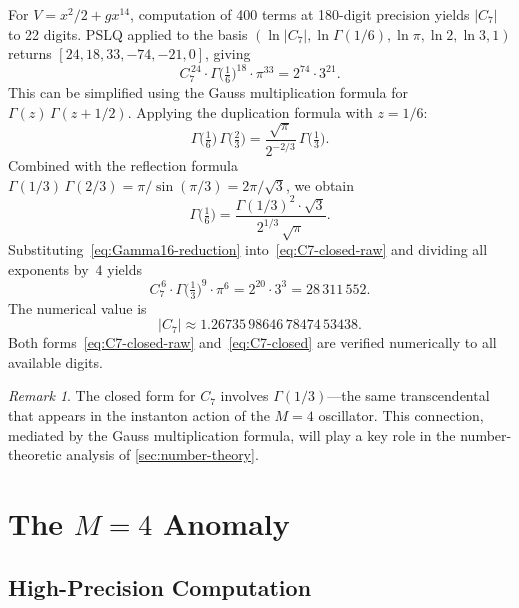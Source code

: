 \documentclass[12pt,a4paper]{article}
\numberwithin{equation}{section}
\theoremstyle{plain}
\theoremstyle{definition}
\theoremstyle{remark}
\newtheorem{remark}[theorem]{Remark}
\begin{document}
For $V = x^2/2 + gx^{14}$, computation of 400 terms at 180-digit precision
yields $|C_7|$ to 22 digits. PSLQ applied to the basis
$(\ln|C_7|, \ln\Gamma(1/6), \ln\pi, \ln 2, \ln 3, 1)$
returns $[24, 18, 33, -74, -21, 0]$, giving
\begin{equation}\label{eq:C7-closed-raw}
  C_7^{\,24} \cdot \Gamma\!\bigl(\tfrac{1}{6}\bigr)^{18} \cdot \pi^{33}
  = 2^{74} \cdot 3^{21}.
\end{equation}
This can be simplified using the Gauss multiplication formula for
$\Gamma(z)\,\Gamma(z + 1/2)$. Applying the duplication formula with
$z = 1/6$:
\[
  \Gamma\!\bigl(\tfrac{1}{6}\bigr)\,\Gamma\!\bigl(\tfrac{2}{3}\bigr)
  = \frac{\sqrt{\pi}}{2^{-2/3}}\,\Gamma\!\bigl(\tfrac{1}{3}\bigr).
\]
Combined with the reflection formula
$\Gamma(1/3)\,\Gamma(2/3) = \pi/\sin(\pi/3) = 2\pi/\sqrt{3}$,
we obtain
\begin{equation}\label{eq:Gamma16-reduction}
  \Gamma\!\bigl(\tfrac{1}{6}\bigr) =
  \frac{\Gamma(1/3)^2 \cdot \sqrt{3}}{2^{1/3}\,\sqrt{\pi}}.
\end{equation}
Substituting~\eqref{eq:Gamma16-reduction}
into~\eqref{eq:C7-closed-raw} and dividing all exponents by~$4$ yields
\begin{equation}\label{eq:C7-closed}
  \boxed{C_7^{\,6} \cdot \Gamma\!\bigl(\tfrac{1}{3}\bigr)^9 \cdot \pi^6
  = 2^{20} \cdot 3^3 = 28\,311\,552.}
\end{equation}
The numerical value is
\begin{equation}\label{eq:C7-value}
  |C_7| \approx 1.26735\,98646\,78474\,53438.
\end{equation}
Both forms~\eqref{eq:C7-closed-raw} and~\eqref{eq:C7-closed} are verified
numerically to all available digits.

\begin{remark}\label{rem:C7-Gamma13}
The closed form for $C_7$ involves $\Gamma(1/3)$---the same transcendental
that appears in the instanton action of the $M = 4$ oscillator. This
connection, mediated by the Gauss multiplication formula, will play a key
role in the number-theoretic analysis of \cref{sec:number-theory}.
\end{remark}

\section{The $M = 4$ Anomaly}
\label{sec:M4}

\subsection{High-Precision Computation}
\label{sec:M4-computation}
\end{document}
